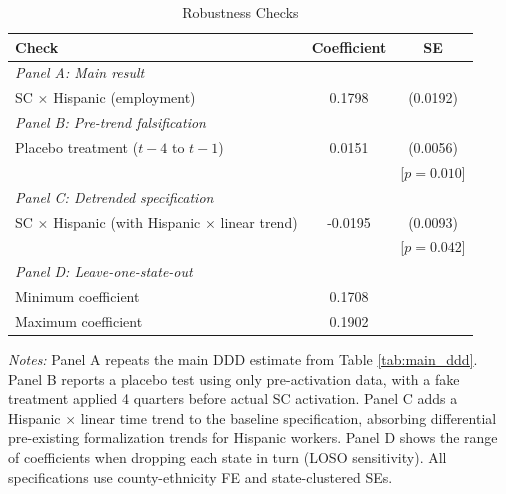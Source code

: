 \begin{table}[htbp]
\centering
\caption{Robustness Checks}
\label{tab:robustness}
\begin{tabular}{lcc}
\toprule
Check & Coefficient & SE \\
\midrule
\textit{Panel A: Main result} & & \\
SC $\times$ Hispanic (employment) & 0.1798 & (0.0192) \\
\midrule
\textit{Panel B: Pre-trend falsification} & & \\
Placebo treatment ($t-4$ to $t-1$) & 0.0151 & (0.0056) \\
 & & [$p = 0.010$] \\
\midrule
\textit{Panel C: Detrended specification} & & \\
SC $\times$ Hispanic (with Hispanic $\times$ linear trend) & -0.0195 & (0.0093) \\
 & & [$p = 0.042$] \\
\midrule
\textit{Panel D: Leave-one-state-out} & & \\
Minimum coefficient & 0.1708 & \\
Maximum coefficient & 0.1902 & \\
\bottomrule
\end{tabular}
\begin{tablenotes}[flushleft]
\small
\item \textit{Notes:} Panel A repeats the main DDD estimate from Table \ref{tab:main_ddd}. Panel B reports a placebo test using only pre-activation data, with a fake treatment applied 4 quarters before actual SC activation. Panel C adds a Hispanic $\times$ linear time trend to the baseline specification, absorbing differential pre-existing formalization trends for Hispanic workers. Panel D shows the range of coefficients when dropping each state in turn (LOSO sensitivity). All specifications use county-ethnicity FE and state-clustered SEs.
\end{tablenotes}
\end{table}


